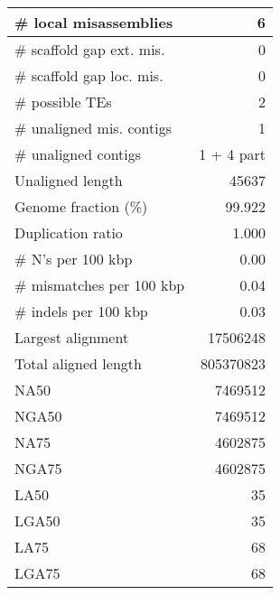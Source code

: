 \documentclass[12pt,a4paper]{article}
\begin{document}
\begin{table}[ht]
\begin{center}
\begin{tabular}{|l*{1}{|r}|}
\# local misassemblies & 6 \\ \hline
\# scaffold gap ext. mis. & 0 \\ \hline
\# scaffold gap loc. mis. & 0 \\ \hline
\# possible TEs & 2 \\ \hline
\# unaligned mis. contigs & 1 \\ \hline
\# unaligned contigs & 1 + 4 part \\ \hline
Unaligned length & 45637 \\ \hline
Genome fraction (\%) & 99.922 \\ \hline
Duplication ratio & 1.000 \\ \hline
\# N's per 100 kbp & 0.00 \\ \hline
\# mismatches per 100 kbp & 0.04 \\ \hline
\# indels per 100 kbp & 0.03 \\ \hline
Largest alignment & 17506248 \\ \hline
Total aligned length & 805370823 \\ \hline
NA50 & 7469512 \\ \hline
NGA50 & 7469512 \\ \hline
NA75 & 4602875 \\ \hline
NGA75 & 4602875 \\ \hline
LA50 & 35 \\ \hline
LGA50 & 35 \\ \hline
LA75 & 68 \\ \hline
LGA75 & 68 \\ \hline
\end{tabular}
\end{center}
\end{table}
\end{document}
